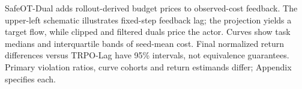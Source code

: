 SafeOT-Dual adds rollout-derived budget prices to observed-cost feedback. The upper-left schematic illustrates fixed-step feedback lag; the projection yields a target flow, while clipped and filtered duals price the actor. Curves show task medians and interquartile bands of seed-mean cost. Final normalized return differences versus TRPO-Lag have 95\% intervals, not equivalence guarantees. Primary violation ratios, curve cohorts and return estimands differ; Appendix specifies each.
